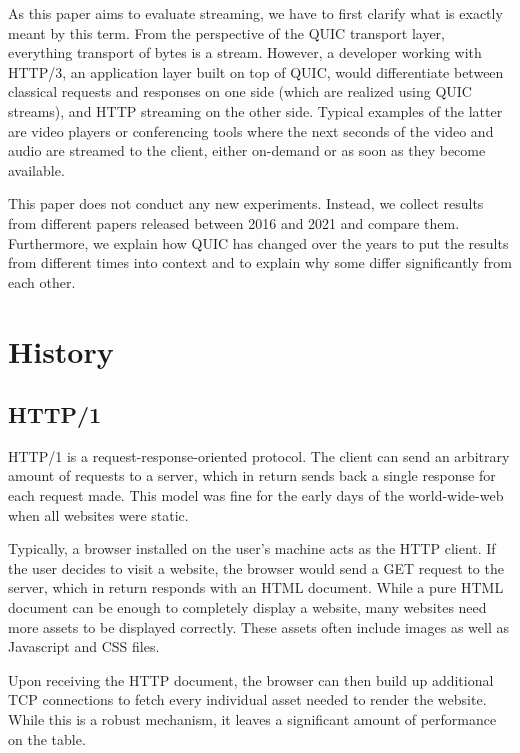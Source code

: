 \documentclass[conference]{IEEEtran}
\begin{document}
As this paper aims to evaluate streaming, we have to first clarify what is exactly meant by this term. From the perspective of the QUIC transport layer, everything transport of bytes is a stream. However, a developer working with HTTP/3, an application layer built on top of QUIC, would differentiate between classical requests and responses on one side (which are realized using QUIC streams), and HTTP streaming on the other side. Typical examples of the latter are video players or conferencing tools where the next seconds of the video and audio are streamed to the client, either on-demand or as soon as they become available.

This paper does not conduct any new experiments. Instead, we collect results from different papers released between 2016 and 2021 and compare them. Furthermore, we explain how QUIC has changed over the years to put the results from different times into context and to explain why some differ significantly from each other.


\section{History}

\subsection{HTTP/1}

HTTP/1 is a request-response-oriented protocol. The client can send an arbitrary amount of requests to a server, which in return sends back a single response for each request made. This model was fine for the early days of the world-wide-web when all websites were static. 

Typically, a browser installed on the user's machine acts as the HTTP client. If the user decides to visit a website, the browser would send a GET request to the server, which in return responds with an HTML document. While a pure HTML document can be enough to completely display a website, many websites need more assets to be displayed correctly. These assets often include images as well as Javascript and CSS files.

Upon receiving the HTTP document, the browser can then build up additional TCP connections to fetch every individual asset needed to render the website. While this is a robust mechanism, it leaves a significant amount of performance on the table.
\end{document}
